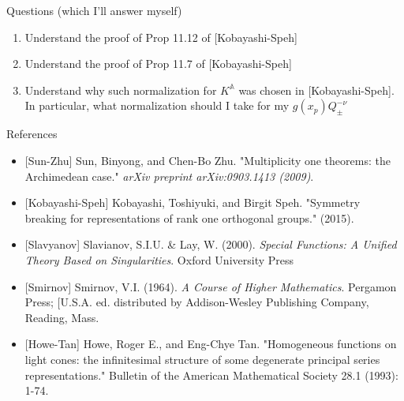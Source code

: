 \documentclass[8pt]{beamer}
\theoremstyle{mystyle}
\begin{document}
\begin{frame}{Questions (which I'll answer myself)}
	\begin{enumerate}
		\item Understand the proof of Prop 11.12 of [Kobayashi-Speh]
		\item Understand the proof of Prop 11.7 of [Kobayashi-Speh]
		\item Understand why such normalization for $K^\mathbb{A}$ was chosen in [Kobayashi-Speh]. In particular, what
			normalization should I take for my $g(x_p)Q_{\pm}^{-\nu}$
	\end{enumerate}
\end{frame}
\begin{frame}{References}
	\begin{itemize}
		\item {[Sun-Zhu]} Sun, Binyong, and Chen-Bo Zhu. "Multiplicity one theorems: the Archimedean case." 
			{\it arXiv preprint arXiv:0903.1413 (2009)}.
		\item {[Kobayashi-Speh]} Kobayashi, Toshiyuki, and Birgit Speh. "Symmetry breaking for representations of rank one orthogonal groups." (2015).
		\item {[Slavyanov]} Slavianov, S.I.U. \&
			Lay, W. (2000). {\it Special Functions: A Unified Theory Based on Singularities}. Oxford University Press
		\item {[Smirnov]} Smirnov, V.I. (1964). {\it A Course of Higher Mathematics}.
			Pergamon Press; [U.S.A. ed. distributed by Addison-Wesley Publishing Company, Reading, Mass.
			\item {[Howe-Tan]} Howe, Roger E., and Eng-Chye Tan. "Homogeneous functions on light cones: the infinitesimal structure of some degenerate principal series representations." Bulletin of the American Mathematical Society 28.1 (1993): 1-74.
	\end{itemize}
\end{frame}
\end{document}
